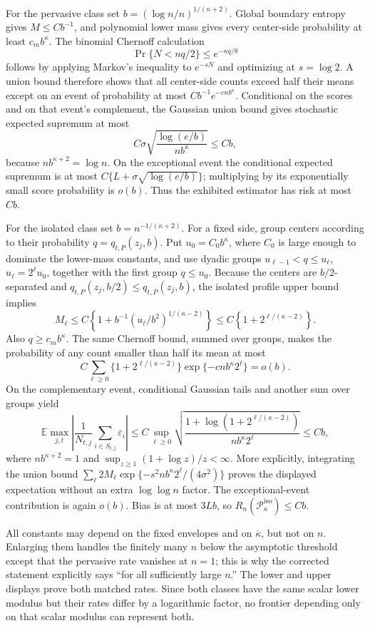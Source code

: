 For the pervasive class set \(b=(\log n/n)^{1/(\kappa+2)}\). Global boundary entropy gives \(M\le Cb^{-1}\), and polynomial lower mass gives every center-side probability at least \(c_mb^\kappa\). The binomial Chernoff calculation
\[
 \Pr\{N<nq/2\}\le e^{-nq/8}
\]
follows by applying Markov's inequality to \(e^{-sN}\) and optimizing at \(s=\log2\). A union bound therefore shows that all center-side counts exceed half their means except on an event of probability at most \(Cb^{-1}e^{-cnb^\kappa}\). Conditional on the scores and on that event's complement, the Gaussian union bound gives stochastic expected supremum at most
\[
 C\sigma\sqrt{\frac{\log(e/b)}{nb^\kappa}}\le Cb,
\]
because \(nb^{\kappa+2}=\log n\). On the exceptional event the conditional expected supremum is at most \(C\{L+\sigma\sqrt{\log(e/b)}\}\); multiplying by its exponentially small score probability is \(o(b)\). Thus the exhibited estimator has risk at most \(Cb\).

For the isolated class set \(b=n^{-1/(\kappa+2)}\). For a fixed side, group centers according to their probability \(q=q_{t,P}(z_j,b)\). Put \(u_0=C_0b^\kappa\), where \(C_0\) is large enough to dominate the lower-mass constants, and use dyadic groups \(u_{\ell-1}<q\le u_\ell\), \(u_\ell=2^\ell u_0\), together with the first group \(q\le u_0\). Because the centers are \(b/2\)-separated and \(q_{t,P}(z_j,b/2)\le q_{t,P}(z_j,b)\), the isolated profile upper bound implies
\[
 M_\ell\le C\left\{1+b^{-1}(u_\ell/b^2)^{1/(\kappa-2)}\right\}
 \le C\left\{1+2^{\ell/(\kappa-2)}\right\}.
\]
Also \(q\ge c_mb^\kappa\). The same Chernoff bound, summed over groups, makes the probability of any count smaller than half its mean at most
\[
 C\sum_{\ell\ge0}\{1+2^{\ell/(\kappa-2)}\}
 \exp\{-cnb^\kappa2^\ell\}=o(b).
\]
On the complementary event, conditional Gaussian tails and another sum over groups yield
\[
 \mathbb E\max_{j,t}\left|\frac1{N_{t,j}}
 \sum_{i\in S_{t,j}}\varepsilon_i\right|
 \le C\sup_{\ell\ge0}
 \sqrt{\frac{1+\log(1+2^{\ell/(\kappa-2)})}{nb^\kappa2^\ell}}
 \le Cb,
\]
where \(nb^{\kappa+2}=1\) and \(\sup_{z\ge1}(1+\log z)/z<\infty\). More explicitly, integrating the union bound \(\sum_\ell2M_\ell\exp\{-s^2nb^\kappa2^\ell/(4\sigma^2)\}\) proves the displayed expectation without an extra \(\log\log n\) factor. The exceptional-event contribution is again \(o(b)\). Bias is at most \(3Lb\), so \(R_n(\mathcal P_\kappa^{\mathrm{iso}})\le Cb\).

All constants may depend on the fixed envelopes and on \(\overline\kappa\), but not on \(n\). Enlarging them handles the finitely many \(n\) below the asymptotic threshold except that the pervasive rate vanishes at \(n=1\); this is why the corrected statement explicitly says ``for all sufficiently large \(n\).'' The lower and upper displays prove both matched rates. Since both classes have the same scalar lower modulus but their rates differ by a logarithmic factor, no frontier depending only on that scalar modulus can represent both.